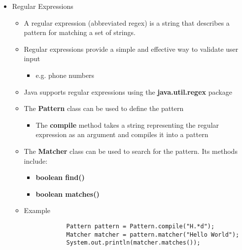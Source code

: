 \begin{itemize}
	\newpage

	\item Regular Expressions
	\begin{itemize}
		\item A regular expression (abbreviated regex) is a string that describes a pattern for matching a set of strings.
		\item Regular expressions provide a simple and effective way to validate user input
		\begin{itemize}
			\item e.g. phone numbers
		\end{itemize}
		\item Java supports regular expressions using the \textbf{java.util.regex} package
		\item The \textbf{Pattern} class can be used to define the pattern
		\begin{itemize}
			\item The \textbf{compile} method takes a string representing the regular expression as an argument and compiles it into a pattern
		\end{itemize}
		\item The \textbf{Matcher} class can be used to search for the pattern. Its methods include:
		\begin{itemize}
			\item \textbf{boolean find()}
			\item \textbf{boolean matches()}
		\end{itemize}
		\item Example
		\begin{Verbatim}
			Pattern pattern = Pattern.compile("H.*d");
			Matcher matcher = pattern.matcher("Hello World");
			System.out.println(matcher.matches());
		\end{Verbatim}
	\end{itemize}


\end{itemize}
